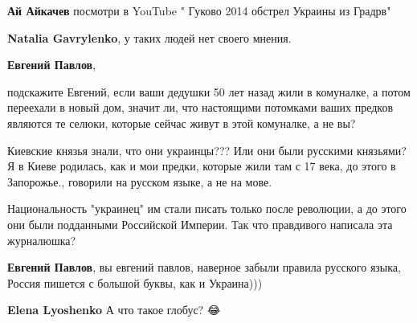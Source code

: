 \begin{itemize}
\begin{itemize}
\textbf{Ай Айкачев} посмотри в YouTube " Гуково 2014 обстрел Украины из Градрв"

 
\textbf{Natalia Gavrylenko}, у таких людей нет своего мнения.

 
\textbf{Евгений Павлов}, 

подскажите Евгений, если ваши дедушки 50 лет назад жили в комуналке, а потом
переехали в новый дом, значит ли, что настоящими потомками ваших предков
являются те селюки, которые сейчас живут в этой комуналке, а не вы? 

Киевские князья знали, что они украинцы??? Или они были русскими князьями? Я в
Киеве родилась, как и мои предки, которые жили там с 17 века, до этого в
Запорожье., говорили на русском языке, а не на мове. 

Национальность "украинец" им стали писать только после революции, а до этого
они были подданными Российской Империи. Так что правдивого написала эта
журналюшка?

 
\textbf{Евгений Павлов}, вы евгений павлов, наверное забыли правила русского языка, Россия пишется с большой буквы, как и Украина)))

 
\textbf{Elena Lyoshenko}
А что такое глобус? 😂

 

\end{itemize}
\end{itemize}
